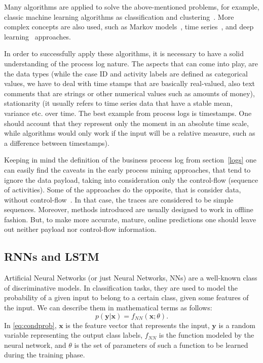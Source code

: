 \par
Many algorithms are applied to solve the above-mentioned problems, for example, classic machine learning algorithms as classification and clustering~\cite{Leontjeva2015}. More complex concepts are also used, such as Markov models~\cite{Leontjeva2015}, time series~\cite{Lam20096986}, and deep learning~\cite{niek96732,evermann,quteprints96732} approaches. 
\par
In order to successfully apply these algorithms, it is necessary to have a solid understanding of the process log nature. The aspects that can come into play, are the data types (while the case ID and activity labels are defined as categorical values, we have to deal with time stamps that are basically real-valued, also text comments that are strings or other numerical values such as amounts of money), stationarity (it usually refers to time series data that have a stable mean, variance etc. over time. The best example from process logs is timestamps. One should account that they represent only the moment in an absolute time scale, while algorithms would only work if the input will be a relative measure, such as a difference between timestamps). 
\par
Keeping in mind the definition of the business process log from section~\ref{logs} one can easily find the caveats in the early process mining approaches, that tend to ignore the data payload, taking into consideration only the control-flow (sequence of activities). Some of the approaches do the opposite, that is consider data, without control-flow~\cite{vanderAalst2010,DBLP:journals/is/AalstSS11,Schonenberg2008}. In that case, the traces are considered to be simple sequences. Moreover, methods introduced are usually designed to work in offline fashion. But, to make more accurate, mature, online predictions one should leave out neither payload nor control-flow information. 


\subsection{RNNs and LSTM}
Artificial Neural Networks (or just Neural Networks, NNs) are a well-known class of discriminative models. In classification tasks, they are
used to model the probability of a given input to belong to a certain
class, given some features of the input. We can describe them in
mathematical terms as follows:
%
\begin{equation}
  \label{eq:condprob}
  p(\mathbf{y}|\mathbf{x}) = f_{\mathit{NN}}(\mathbf{x}; \theta).
\end{equation}
%
In \eqref{eq:condprob}, $\mathbf{x}$ is the feature vector that represents the input,
$\mathbf{y}$ is a random variable representing the output class
labels, $f_{\mathit{NN}}$ is the function modeled by the neural network, and
$\theta$ is the set of parameters of such a function to be learned during
the training phase.


